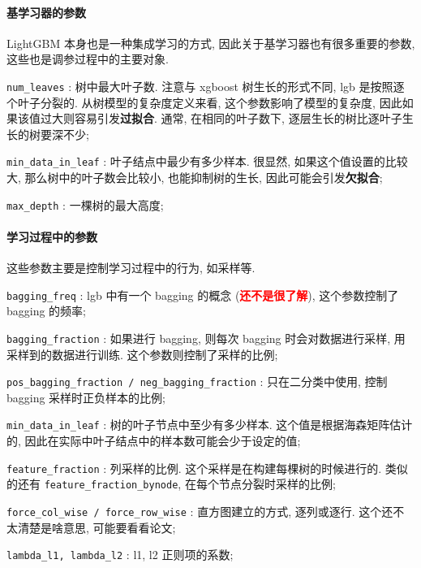 \paragraph{基学习器的参数}
LightGBM 本身也是一种集成学习的方式, 因此关于基学习器也有很多重要的参数, 这些也是调参过程中的主要对象.
\begin{myitemize}
	\item \texttt{num_leaves} : 树中最大叶子数. 注意与 xgboost 树生长的形式不同, lgb 是按照逐个叶子分裂的. 从树模型的复杂度定义来看, 这个参数影响了模型的复杂度, 因此如果该值过大则容易引发\textbf{过拟合}. 通常, 在相同的叶子数下, 逐层生长的树比逐叶子生长的树要深不少;
	
	\item \texttt{min_data_in_leaf} : 叶子结点中最少有多少样本. 很显然, 如果这个值设置的比较大, 那么树中的叶子数会比较小, 也能抑制树的生长, 因此可能会引发\textbf{欠拟合};
	
	\item \texttt{max_depth} : 一棵树的最大高度;
	
	
\end{myitemize}

\paragraph{学习过程中的参数}
这些参数主要是控制学习过程中的行为, 如采样等.
\begin{myitemize}
	\item \texttt{bagging_freq} : lgb 中有一个 bagging 的概念 (\textbf{\textcolor{red}{还不是很了解}}), 这个参数控制了 bagging 的频率;
	
	\item \texttt{bagging_fraction} : 如果进行 bagging, 则每次 bagging 时会对数据进行采样, 用采样到的数据进行训练. 这个参数则控制了采样的比例;
	
	\item \texttt{pos_bagging_fraction / neg_bagging_fraction} : 只在二分类中使用, 控制 bagging 采样时正负样本的比例;
	
	\item \texttt{min_data_in_leaf} : 树的叶子节点中至少有多少样本. 这个值是根据海森矩阵估计的, 因此在实际中叶子结点中的样本数可能会少于设定的值;
	
	\item \texttt{feature_fraction} : 列采样的比例. 这个采样是在构建每棵树的时候进行的. 类似的还有 \texttt{feature_fraction_bynode}, 在每个节点分裂时采样的比例;
	
	
	\item \texttt{force_col_wise / force_row_wise} : 直方图建立的方式, 逐列或逐行. 这个还不太清楚是啥意思, 可能要看看论文;
	
	\item \texttt{lambda_l1, lambda_l2} : l1, l2 正则项的系数;
	
	\item 
\end{myitemize}


